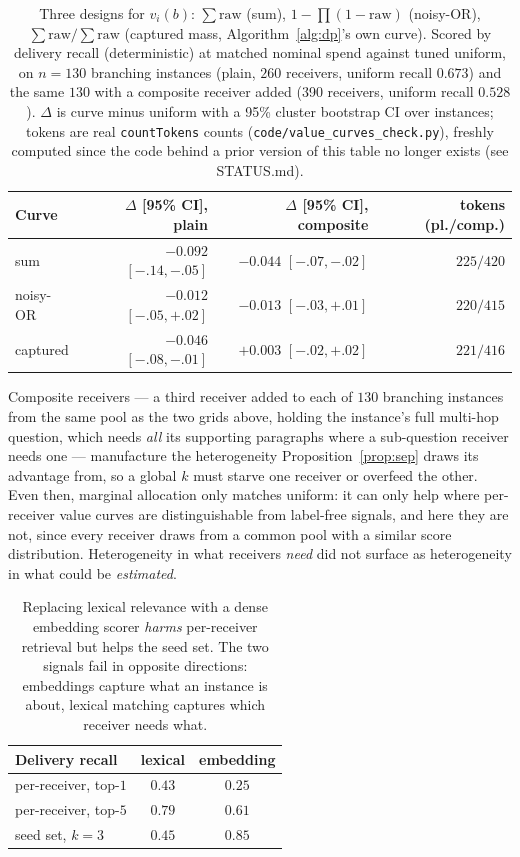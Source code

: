 \documentclass[sigconf,anonymous]{aamas}
\theoremstyle{remark}
\begin{document}
\begin{table}[t]
\centering
\caption{Three designs for $v_i(b)$: $\sum\mathrm{raw}$ (sum),
$1-\prod(1-\mathrm{raw})$ (noisy-OR), $\sum\mathrm{raw}/\sum\mathrm{raw}$
(captured mass, Algorithm~\ref{alg:dp}'s own curve). Scored by delivery
recall (deterministic) at matched nominal spend against tuned uniform,
on $n=130$ branching instances (plain, $260$ receivers, uniform
recall $0.673$) and the same $130$ with a composite receiver added
(390 receivers, uniform recall $0.528$). $\Delta$ is curve minus
uniform with a 95\% cluster bootstrap CI over instances; tokens are
real \texttt{countTokens} counts
(\texttt{code/value\_curves\_check.py}), freshly computed since the
code behind a prior version of this table no longer exists (see
STATUS.md).}
\label{tab:curves}
\footnotesize
\setlength{\tabcolsep}{3pt}
\begin{tabular}{lrrr}
\toprule
Curve & $\Delta$ [95\% CI], plain & $\Delta$ [95\% CI], composite & tokens (pl./comp.) \\
\midrule
sum      & $-0.092$ $[-.14,-.05]$ & $-0.044$ $[-.07,-.02]$ & $225/420$ \\
noisy-OR & $-0.012$ $[-.05,+.02]$ & $-0.013$ $[-.03,+.01]$ & $220/415$ \\
captured & $-0.046$ $[-.08,-.01]$ & $+0.003$ $[-.02,+.02]$ & $221/416$ \\
\bottomrule
\end{tabular}
\end{table}

Composite receivers --- a third receiver added to each of $130$
branching instances from the same pool as the two grids above, holding
the instance's full multi-hop question, which needs \emph{all} its
supporting paragraphs where a sub-question receiver needs one ---
manufacture the heterogeneity Proposition~\ref{prop:sep} draws its
advantage from, so a global $k$ must starve one receiver or overfeed
the other. Even then, marginal allocation only matches uniform: it can
only help where per-receiver value curves are distinguishable from
label-free signals, and here they are not, since every receiver draws
from a common pool with a similar score distribution. Heterogeneity in
what receivers \emph{need} did not surface as heterogeneity in what
could be \emph{estimated}.

\begin{table}[t]
\centering
\caption{Replacing lexical relevance with a dense embedding scorer
\emph{harms} per-receiver retrieval but helps the seed set. The two
signals fail in opposite directions: embeddings capture what an
instance is about, lexical matching captures which receiver needs
what.}
\label{tab:scorer}
\begin{tabular}{lcc}
\toprule
Delivery recall & lexical & embedding \\
\midrule
per-receiver, top-$1$ & $\mathbf{0.43}$ & $0.25$ \\
per-receiver, top-$5$ & $\mathbf{0.79}$ & $0.61$ \\
seed set, $k{=}3$     & $0.45$ & $\mathbf{0.85}$ \\
\bottomrule
\end{tabular}
\end{table}
\end{document}
